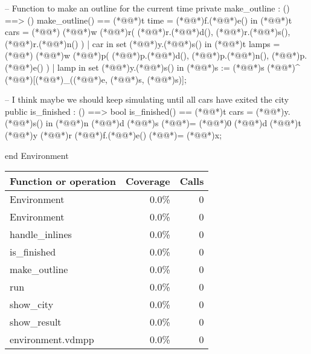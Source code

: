\documentclass[a4paper]{article}
\begin{document}
\begin{vdm_al}
    -- Function to make an outline for the current time
    private make_outline : () ==> ()
    make_outline() ==
        (*@@*)t time = (*@@*)f.(*@@*)e() in
            (*@@*)t cars = (*@\vdmnotcovered{}@*){
                (*@@*)w (*@@*)r(
                    (*@@*)r.(*@@*)d(),
                    (*@@*)r.(*@@*)s(),
                    (*@@*)r.(*@@*)n()
                ) | car in set (*@@*)y.(*@@*)s()
            } in 
                (*@@*)t lamps = (*@\vdmnotcovered{}@*){
                    (*@@*)w (*@@*)p(
                        (*@@*)p.(*@@*)d(),
                        (*@@*)p.(*@@*)n(),
                        (*@@*)p.(*@@*)e()
                    ) | lamp in set (*@@*)y.(*@@*)s()
                } in
                    (*@@*)s := (*@@*)s (*@\vdmnotcovered{}@*)^ (*@\vdmnotcovered{}@*)[(*@@*)_((*@@*)e, (*@@*)s, (*@@*)s)];

    -- I think maybe we should keep simulating until all cars have exited the city
    public is_finished : () ==> bool 
    is_finished() == 
        (*@@*)t cars = (*@@*)y.(*@@*)s() in
            (*@@*)n (*@@*)d (*@@*)s (*@\vdmnotcovered{}@*)= (*@\vdmnotcovered{}@*)0 (*@@*)d (*@@*)t (*@@*)y (*@@*)r (*@@*)f.(*@@*)e() (*@\vdmnotcovered{>}@*)= (*@@*)x;

end Environment
\end{vdm_al}
\bigskip
\begin{longtable}{|l|r|r|}
\hline
Function or operation & Coverage & Calls \\
\hline
\hline
Environment & 0.0\% & 0 \\
\hline
Environment & 0.0\% & 0 \\
\hline
handle\_inlines & 0.0\% & 0 \\
\hline
is\_finished & 0.0\% & 0 \\
\hline
make\_outline & 0.0\% & 0 \\
\hline
run & 0.0\% & 0 \\
\hline
show\_city & 0.0\% & 0 \\
\hline
show\_result & 0.0\% & 0 \\
\hline
\hline
environment.vdmpp & 0.0\% & 0 \\
\hline
\end{longtable}
\end{document}
